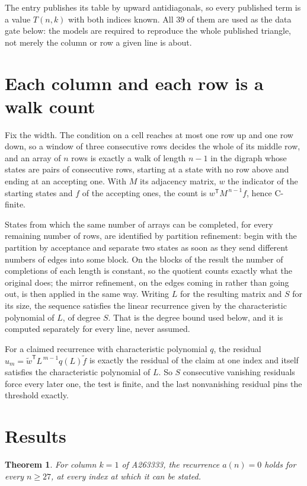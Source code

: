 \documentclass[11pt]{article}
\newtheorem{theorem}{Theorem}
\theoremstyle{definition}
\begin{document}
The entry publishes its table by upward antidiagonals, so every published term is a value $T(n,k)$ with both indices known. All 39 of them are used as the data gate below: the models are required to reproduce the whole published triangle, not merely the column or row a given line is about.

\section{Each column and each row is a walk count}

Fix the width. The condition on a cell reaches at most one row up and one row down, so a window of three consecutive rows decides the whole of its middle row, and an array of $n$ rows is exactly a walk of length $n-1$ in the digraph whose states are pairs of consecutive rows, starting at a state with no row above and ending at an accepting one. With $M$ its adjacency matrix, $w$ the indicator of the starting states and $f$ of the accepting ones, the count is $w^{\mathsf T}M^{\,n-1}f$, hence C-finite.

States from which the same number of arrays can be completed, for every remaining number of rows, are identified by partition refinement: begin with the partition by acceptance and separate two states as soon as they send different numbers of edges into some block. On the blocks of the result the number of completions of each length is constant, so the quotient counts exactly what the original does; the mirror refinement, on the edges coming in rather than going out, is then applied in the same way. Writing $L$ for the resulting matrix and $S$ for its size, the sequence satisfies the linear recurrence given by the characteristic polynomial of $L$, of degree $S$. That is the degree bound used below, and it is computed separately for every line, never assumed.

For a claimed recurrence with characteristic polynomial $q$, the residual $u_m = \tilde w^{\mathsf T}L^{\,m-1}q(L)\tilde f$ is exactly the residual of the claim at one index and itself satisfies the characteristic polynomial of $L$. So $S$ consecutive vanishing residuals force every later one, the test is finite, and the last nonvanishing residual pins the threshold exactly.

\section{Results}

\begin{theorem} For column $k = 1$ of A263333, the recurrence $a(n) = 0$ holds for every $n \ge 27$, at every index at which it can be stated.\end{theorem}
\end{document}
